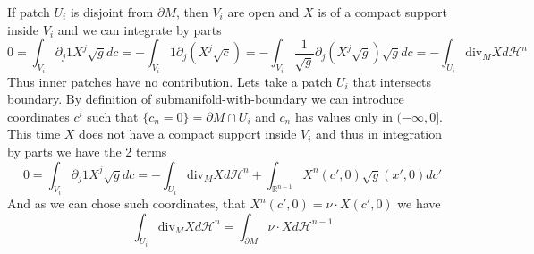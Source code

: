 \vspace{1ex}
If patch $U_i$ is disjoint from $\partial M$, then $V_i$ are open and $X$ is of
a compact support inside $V_i$ and we can integrate by parts
\[0=\int_{V_i}\partial_j 1X^j\sqrt gdc=-\int_{V_i}1\partial_j(X^j\sqrt c)=
-\int_{V_i}\frac{1}{\sqrt g}\partial_j(X^j\sqrt g)\sqrt gdc=-\int_{U_i}\text{div}_M Xd\mathcal H^n\]
Thus inner patches have no contribution. Lets take a patch $U_i$ that intersects
boundary. By definition of submanifold-with-boundary we can introduce coordinates
$c^i$ such that $\{c_n=0\}=\partial M\cap U_i$ and $c_n$ has values only in
$(-\infty,0]$. This time $X$ does not have a compact support inside $V_i$ and
thus in integration by parts we have the 2 terms
\[0=\int_{V_i}\partial_j 1X^j\sqrt gdc=-\int_{U_i}\text{div}_M Xd\mathcal H^n+\int_{\mathbb R^{n-1}}X^n(c',0)\sqrt g(x',0)dc'\]
And as we can chose such coordinates, that $X^n(c',0)=\nu\cdot X(c',0)$ we have
\[\int_{U_i}\text{div}_M Xd\mathcal H^n=\int_{\partial M}\nu\cdot Xd\mathcal H^{n-1}\]
